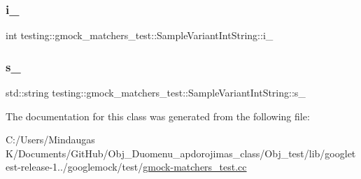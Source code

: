 \subsubsection{\texorpdfstring{i\_}{i\_}}
{\footnotesize\ttfamily int testing\+::gmock\+\_\+matchers\+\_\+test\+::\+Sample\+Variant\+Int\+String\+::i\+\_\+\hspace{0.3cm}{\ttfamily [private]}}

\mbox{\label{classtesting_1_1gmock__matchers__test_1_1_sample_variant_int_string_a0c5a6109142e79a646654be797287328}} 
\subsubsection{\texorpdfstring{s\_}{s\_}}
{\footnotesize\ttfamily std\+::string testing\+::gmock\+\_\+matchers\+\_\+test\+::\+Sample\+Variant\+Int\+String\+::s\+\_\+\hspace{0.3cm}{\ttfamily [private]}}



The documentation for this class was generated from the following file\+:\begin{DoxyCompactItemize}
\item 
C\+:/\+Users/\+Mindaugas K/\+Documents/\+Git\+Hub/\+Obj\+\_\+\+Duomenu\+\_\+apdorojimas\+\_\+class/\+Obj\+\_\+test/lib/googletest-\/release-\/1../googlemock/test/\mbox{\hyperlink{_obj__test_2lib_2googletest-release-1_88_81_2googlemock_2test_2gmock-matchers__test_8cc}{gmock-\/matchers\+\_\+test.\+cc}}\end{DoxyCompactItemize}
